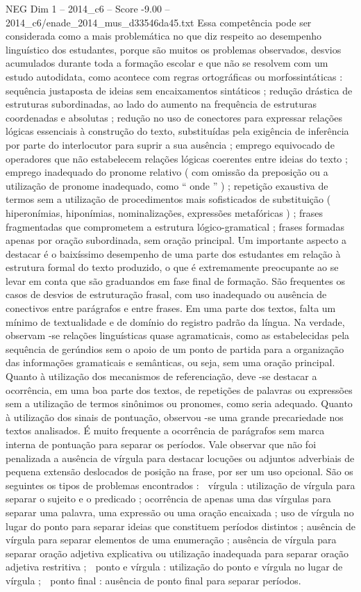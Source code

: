 \begin{textsample}{NEG Dim 1 – 2014\_c6 – Score -9.00 – 2014\_c6/enade\_2014\_mus\_d33546da45.txt}
Essa competência pode ser considerada como a mais problemática no que diz respeito ao desempenho linguístico dos estudantes, porque são muitos os problemas observados, desvios acumulados durante toda a formação escolar e que não se resolvem com um estudo autodidata, como acontece com regras ortográficas ou morfossintáticas : sequência justaposta de ideias sem encaixamentos sintáticos ; redução drástica de estruturas subordinadas, ao lado do aumento na frequência de estruturas coordenadas e absolutas ; redução no uso de conectores para expressar relações lógicas essenciais à construção do texto, substituídas pela exigência de inferência por parte do interlocutor para suprir a sua ausência ; emprego equivocado de operadores que não estabelecem relações lógicas coerentes entre ideias do texto ; emprego inadequado do pronome relativo ( com omissão da preposição ou a utilização de pronome inadequado, como “ onde ” ) ; repetição exaustiva de termos sem a utilização de procedimentos mais sofisticados de substituição ( hiperonímias, hiponímias, nominalizações, expressões metafóricas ) ; frases fragmentadas que comprometem a estrutura lógico-gramatical ; frases formadas apenas por oração subordinada, sem oração principal.
Um importante aspecto a destacar é o baixíssimo desempenho de uma parte dos estudantes em relação à estrutura formal do texto produzido, o que é extremamente preocupante ao se levar em conta que são graduandos em fase final de formação.
São frequentes os casos de desvios de estruturação frasal, com uso inadequado ou ausência de conectivos entre parágrafos e entre frases.
Em uma parte dos textos, falta um mínimo de textualidade e de domínio do registro padrão da língua.
Na verdade, observam -se relações linguísticas quase agramaticais, como as estabelecidas pela sequência de gerúndios sem o apoio de um ponto de partida para a organização das informações gramaticais e semânticas, ou seja, sem uma oração principal.
Quanto à utilização dos mecanismos de referenciação, deve -se destacar a ocorrência, em uma boa parte dos textos, de repetições de palavras ou expressões sem a utilização de termos sinônimos ou pronomes, como seria adequado.
Quanto à utilização dos sinais de pontuação, observou -se uma grande precariedade nos textos analisados.
É muito frequente a ocorrência de parágrafos sem marca interna de pontuação para separar os períodos.
Vale observar que não foi penalizada a ausência de vírgula para destacar locuções ou adjuntos adverbiais de pequena extensão deslocados de posição na frase, por ser um uso opcional.
São os seguintes os tipos de problemas encontrados :  vírgula : utilização de vírgula para separar o sujeito e o predicado ; ocorrência de apenas uma das vírgulas para separar uma palavra, uma expressão ou uma oração encaixada ; uso de vírgula no lugar do ponto para separar ideias que constituem períodos distintos ; ausência de vírgula para separar elementos de uma enumeração ; ausência de vírgula para separar oração adjetiva explicativa ou utilização inadequada para separar oração adjetiva restritiva ;  ponto e vírgula : utilização do ponto e vírgula no lugar de vírgula ;  ponto final : ausência de ponto final para separar períodos.

\end{textsample}
